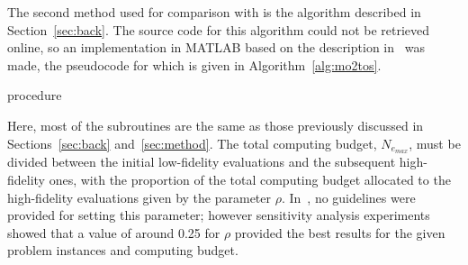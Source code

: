 The second method used for comparison with \AlgName{} is the \motos{} algorithm described in Section~\ref{sec:back}. The source code for this algorithm could not be retrieved online, so an implementation in MATLAB based on the description in~\cite{xu2016mo2tos} was made, the pseudocode for which is given in Algorithm~\ref{alg:mo2tos}.

\begin{algorithm}[h!] 
\caption{\motos{} procedure}
\label{alg:mo2tos}
{\footnotesize
\begin{algorithmic}[1]
 
 
 
 
 
 
   
   
   
   
   
\ENDWHILE
{} 
\end{algorithmic}
}
\end{algorithm}

Here, most of the subroutines are the same as those previously discussed in Sections~\ref{sec:back} and~\ref{sec:method}. The total computing budget, $N_{e_{max}}$, must be divided between the initial low-fidelity evaluations and the subsequent high-fidelity ones, with the proportion of the total computing budget allocated to the high-fidelity evaluations given by the parameter $\rho$. In~\cite{xu2016mo2tos}, no guidelines were provided for setting this parameter; however sensitivity analysis experiments showed that a value of around 0.25 for $\rho$ provided the best results for the given problem instances and computing budget. 

